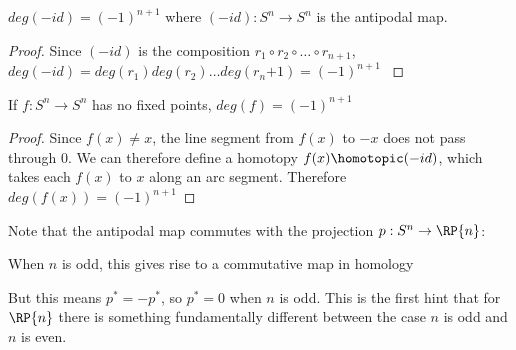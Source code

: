 \begin{corollary}\label{antipodal-degree}
$deg(-id)=(-1)^{n+1}$ where $(-id):S^n\rightarrow S^n$ is the antipodal map.
\begin{corollary}
\begin{proof}
\item Since $(-id)$ is the composition $r_1\circ r_2 \circ \dots \circ r_{n+1}$, $deg(-id)=deg(r_1)deg(r_2)\dots deg(r_n{+1})=(-1)^{n+1}$
\cite{Hatcher}
\end{proof}

\begin{corollary}
If $f:S^n\rightarrow S^n$ has no fixed points, $deg(f)=(-1)^{n+1}$
\end{corollary}
\begin{proof}
Since $f(x)\neq x$, the line segment from $f(x)$ to $-x$ does not pass through $0$. We can therefore define a homotopy $f(x)\homotopic (-id)$, which takes each $f(x)$ to $x$ along an arc segment. Therefore $deg(f(x))=(-1)^{n+1}$\cite{Hatcher}
\end{proof}

\begin{remark}
Note that the antipodal map commutes with the projection $p:S^n\rightarrow \RP{n}$:
When $n$ is odd, this gives rise to a commutative map in homology


But this means $p^*=-p^*$, so $p^*=0$ when $n$ is odd. This is the first hint that for $\RP{n}$ there is something fundamentally different between the case $n$ is odd and $n$ is even. 


\end{remark}
\end{corollary}
\end{corollary}
